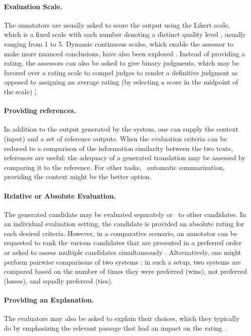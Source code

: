 \paragraph{Evaluation Scale.} The annotators are usually asked to score the output using the Likert scale, which is a fixed scale with each number denoting a distinct quality level \citep{likert1932technique}, usually ranging from 1 to 5. Dynamic continuous scales, which enable the assessor to make more nuanced conclusions, have also been explored \citep{belz-kow-2011-discrete}. Instead of providing a rating, the assessors can also be asked to give binary judgments, which may be favored over a rating scale to compel judges to render a definitive judgment as opposed to assigning an average rating (by selecting a score in the midpoint of the scale) \citep{horbach-etal-2020-linguistic}].

\paragraph{Providing references.} In addition to the output generated by the system, one can supply the context (input) and a set of reference outputs. When the evaluation criteria can be reduced to a comparison of the information similarity between the two texts, references are useful: the adequacy of a generated translation may be assessed by comparing it to the reference. For other tasks, {\eg}\ automatic summarization, providing the context might be the better option.

\paragraph{Relative or Absolute Evaluation.} The generated candidate may be evaluated separately or {\wrt}\ to other candidates. In an individual evaluation setting, the candidate is provided an absolute rating for each desired criteria. However, in a comparative scenario, an annotator can be requested to rank the various candidates that are presented in a preferred order \citep{dusek2020evaluating} or asked to assess multiple candidates simultaneously \citep{novikova2017we}. Alternatively, one might perform pairwise comparisons of two systems \citep{dhingra-etal-2019-handling}: in such a setup, two systems are compared based on the number of times they were preferred (wins), not preferred (losses), and equally preferred (ties).

\paragraph{Providing an Explanation.} The evaluators may also be asked to explain their choices, which they typically do by emphasizing the relevant passage that had an impact on the rating \citep{chaganty-etal-2018-price}.

